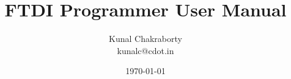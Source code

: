 

\documentclass[a4paper,12pt]{report}%

\title{FTDI Programmer User Manual}
\date{\today}
\author{Kunal Chakraborty\\ kunalc@cdot.in}

\setlength{\parindent}{0pt}
\setlength{\parskip}{1em}


\maketitle



\section{Introduction}\label{intro}	%

FTDI-programmer is an application written in pure python to access/program on board devices through FTDI devices 
using JTAG/SPI/I2C/GPIO interfaces. JTAG programming is done through svf file. It can be used in place of any 
external emulator. The application is built on PyFtdi driver. %



The source code is compatible with both Windows and Linux system. However this manual is written from a windows 
user's point of view.


This is a Beta %
version and hence the application has couple of limitations as listed in section \ref{sec:limit} 

